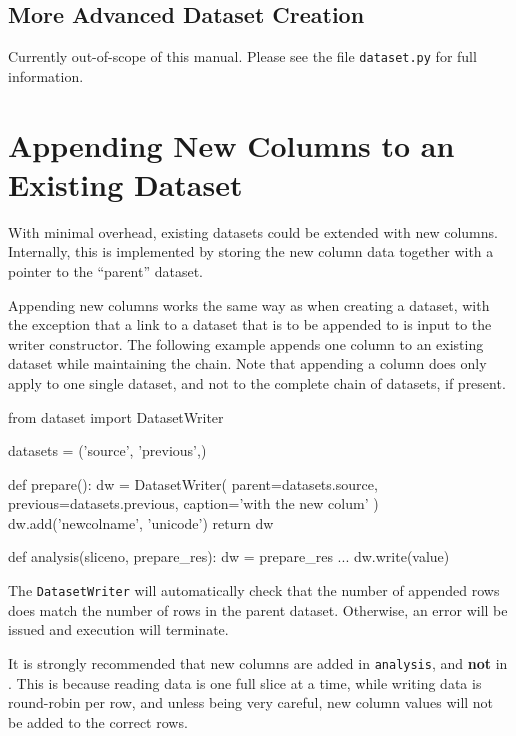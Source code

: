 \subsection{More Advanced Dataset Creation}
Currently out-of-scope of this manual.  Please see the file
\texttt{dataset.py} for full information.


\section{Appending New Columns to an Existing Dataset}

With minimal overhead, existing datasets could be extended with new
columns.  Internally, this is implemented by storing the new column
data together with a pointer to the ``parent'' dataset.

Appending new columns works the same way as when creating a dataset,
with the exception that a link to a dataset that is to be appended to
is input to the writer constructor.  The following example appends one
column to an existing dataset while maintaining the chain.  Note that
appending a column does only apply to one single dataset, and not to
the complete chain of datasets, if present.
\begin{python}
from dataset import DatasetWriter

datasets = ('source', 'previous',)

def prepare():
    dw = DatasetWriter(
        parent=datasets.source,
        previous=datasets.previous,
        caption='with the new colum'
    )
    dw.add('newcolname', 'unicode')
    return dw

def analysis(sliceno, prepare_res):
    dw = prepare_res
    ...
    dw.write(value)
\end{python}
The \texttt{DatasetWriter} will automatically check that the number of
appended rows does match the number of rows in the parent dataset.
Otherwise, an error will be issued and execution will terminate.

It is strongly recommended that new columns are added
in \texttt{analysis}, and \textbf{not} in \synthesis.  This is because
reading data is one full slice at a time, while writing data is
round-robin per row, and unless being very careful, new column values
will not be added to the correct rows.
